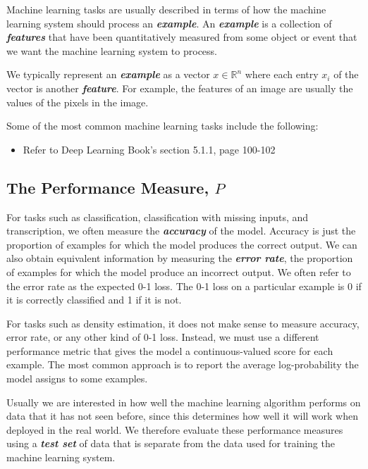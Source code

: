 \documentclass{report}
\begin{document}
\noindent Machine learning tasks are usually described in terms of how the machine learning system should process an \textit{\textbf{example}}. An \textbf{\textit{example}} is a collection of \textbf{\textit{features}} that have been quantitatively measured from some object or event that we want the machine learning system to process. 

\noindent We typically represent an \textbf{\textit{example}} as a vector $x \in \mathbb{R}^n$ where each entry $x_i$ of the vector is another \textbf{\textit{feature}}. For example, the features of an image are usually the values of the pixels in the image.\newline

\noindent Some of the most common machine learning tasks include the following:\newline
\begin{itemize}
	\item Refer to Deep Learning Book's section 5.1.1, page 100-102
\end{itemize}

\subsection{The Performance Measure, $P$}
\noindent For tasks such as classification, classification with missing inputs, and transcription, we often measure the \textbf{\textit{accuracy}} of the model. Accuracy is just the proportion of examples for which the model produces the correct output. We can also obtain equivalent information by measuring the \textbf{\textit{error rate}}, the proportion of examples for which the model produce an incorrect output. We often refer to the error rate as the expected 0-1 loss. The 0-1 loss on a particular example is 0 if it is correctly classified and 1 if it is not. \newline

\noindent For tasks such as density estimation, it does not make sense to measure accuracy, error rate, or any other kind of 0-1 loss. Instead, we must use a different performance metric that gives the model a continuous-valued score for each example. The most common approach is to report the average log-probability the model assigns to some examples.\newline

\noindent Usually we are interested in how well the machine learning algorithm performs on data that it has not seen before, since this determines how well it will work when deployed in the real world. We therefore evaluate these performance measures using a \textbf{\textit{test set}} of data that is separate from the data used for training the machine learning system.\newline
\end{document}
